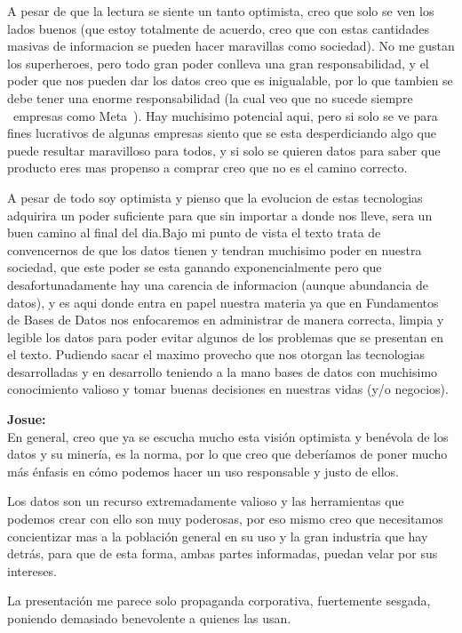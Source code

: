 \documentclass[12pt,a4paper]{article}
\begin{document}
\begin{enumerate}
\begin{enumerate}
				A pesar de que la lectura se siente un tanto optimista, creo que solo se ven los lados buenos (que estoy totalmente de 
				acuerdo, creo que con estas cantidades masivas de informacion se pueden hacer maravillas como sociedad).
				No me gustan los superheroes, pero todo gran poder conlleva una gran responsabilidad, y el poder que nos pueden dar los
				datos creo que es inigualable, por lo que tambien se debe tener una enorme responsabilidad (la cual veo que no sucede 
				siempre ~empresas como Meta~).
				Hay muchisimo potencial aqui, pero si solo se ve para fines lucrativos de algunas empresas siento que se esta 
				desperdiciando algo que puede resultar maravilloso para todos, y si solo se quieren datos para saber que producto eres mas
				propenso a comprar creo que no es el camino correcto.

				A pesar de todo soy optimista y pienso que la evolucion de estas tecnologias adquirira un poder suficiente para que sin
				importar a donde nos lleve, sera un buen camino al final del dia.Bajo mi punto de vista el texto trata de convencernos de
				que los datos tienen y tendran muchisimo poder en nuestra sociedad, que este poder se esta ganando exponencialmente pero 
				que desafortunadamente hay una carencia de informacion (aunque abundancia de datos), y es aqui donde entra en papel 
				nuestra materia ya que en Fundamentos de Bases de Datos nos enfocaremos en administrar de manera correcta, limpia y legible 
				los datos para poder evitar algunos de los problemas que se presentan en el texto. Pudiendo sacar el maximo provecho que 
				nos otorgan las tecnologias desarrolladas y en desarrollo teniendo a la mano bases de datos con muchisimo conocimiento 
				valioso y tomar buenas decisiones en nuestras vidas (y/o negocios).
				
				
				\textbf{Josue:}\\
				
				En general, creo que ya se escucha mucho esta visión optimista y benévola de los datos y su minería, es la norma, por lo que creo que deberíamos de poner mucho más énfasis en cómo podemos hacer un uso responsable y justo de ellos.

Los datos son un recurso extremadamente valioso y las herramientas que podemos crear con ello son muy poderosas, por eso mismo creo que necesitamos concientizar mas a la población general en su uso y la gran industria que hay detrás, para que de esta forma, ambas partes informadas, puedan velar por sus intereses. 

La presentación me parece solo propaganda corporativa, fuertemente sesgada, poniendo demasiado benevolente a quienes las usan.



\end{enumerate}
\end{enumerate}
\end{document}
